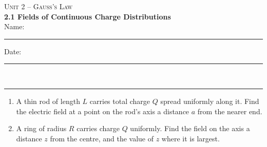 \documentclass[11pt,letterpaper]{article}
\begin{document}
{\small\textsc{Unit 2 -- Gauss's Law}}\\[2pt]{\Large\bfseries 2.1 Fields of Continuous Charge Distributions}\\[8pt]Name: \rule{2.4in}{0.4pt} \hfill Date: \rule{1.4in}{0.4pt}\\[4pt]\hrule\vspace{10pt}{\small\itshape Placeholder worksheet for the site prototype. Free for classroom use.}\vspace{6pt}
\begin{enumerate}[leftmargin=*,itemsep=10pt]
\item A thin rod of length $L$ carries total charge $Q$ spread uniformly along it. Find the electric field at a point on the rod's axis a distance $a$ from the nearer end.
\vspace{2.2in}
\item A ring of radius $R$ carries charge $Q$ uniformly. Find the field on the axis a distance $z$ from the centre, and the value of $z$ where it is largest.
\vspace{2.2in}
\end{enumerate}
\end{document}
